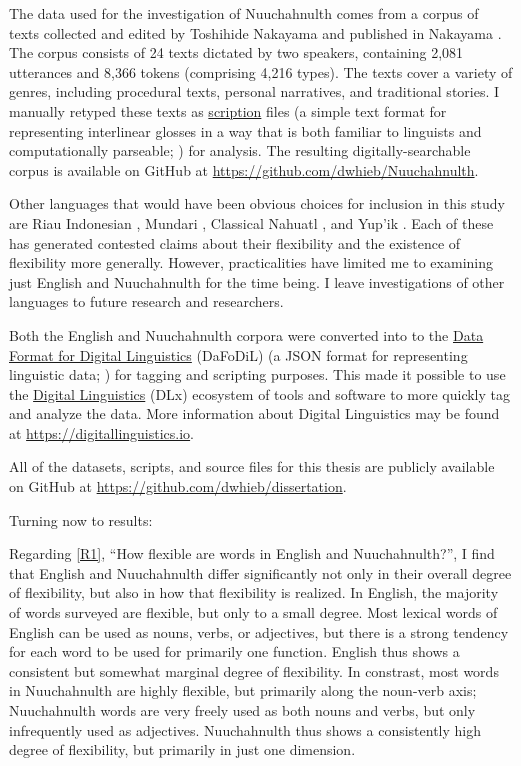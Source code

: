 The data used for the investigation of Nuuchahnulth comes from a corpus of texts collected and edited by Toshihide Nakayama and published in Nakayama . The corpus consists of 24 texts dictated by two speakers, containing 2,081 utterances and 8,366 tokens (comprising 4,216 types). The texts cover a variety of genres, including procedural texts, personal narratives, and traditional stories. I manually retyped these texts as \href{https://scription.digitallinguistics.io}{scription} files (a simple text format for representing interlinear glosses in a way that is both familiar to linguists and computationally parseable; ) for analysis. The resulting digitally-searchable corpus is available on GitHub at \url{https://github.com/dwhieb/Nuuchahnulth}.

Other languages that would have been obvious choices for inclusion in this study are Riau Indonesian , Mundari , Classical Nahuatl , and Yup'ik . Each of these has generated contested claims about their flexibility and the existence of flexibility more generally. However, practicalities have limited me to examining just English and Nuuchahnulth for the time being. I leave investigations of other languages to future research and researchers.

Both the English and Nuuchahnulth corpora were converted into to the \href{https://format.digitallinguistics.io}{Data Format for Digital Linguistics} (DaFoDiL) (a JSON format for representing linguistic data; ) for tagging and scripting purposes. This made it possible to use the \href{https://digitallinguistics.io}{Digital Linguistics} (DLx) ecosystem of tools and software to more quickly tag and analyze the data. More information about Digital Linguistics may be found at \url{https://digitallinguistics.io}.

All of the datasets, scripts, and source files for this thesis are publicly available on GitHub at \url{https://github.com/dwhieb/dissertation}.

Turning now to results:

Regarding \ref{R1}, \enquote{How flexible are words in English and Nuuchahnulth?}, I find that English and Nuuchahnulth differ significantly not only in their overall degree of flexibility, but also in how that flexibility is realized. In English, the majority of words surveyed are flexible, but only to a small degree. Most lexical words of English can be used as nouns, verbs, or adjectives, but there is a strong tendency for each word to be used for primarily one function. English thus shows a consistent but somewhat marginal degree of flexibility. In constrast, most words in Nuuchahnulth are highly flexible, but primarily along the noun-verb axis; Nuuchahnulth words are very freely used as both nouns and verbs, but only infrequently used as adjectives. Nuuchahnulth thus shows a consistently high degree of flexibility, but primarily in just one dimension.


